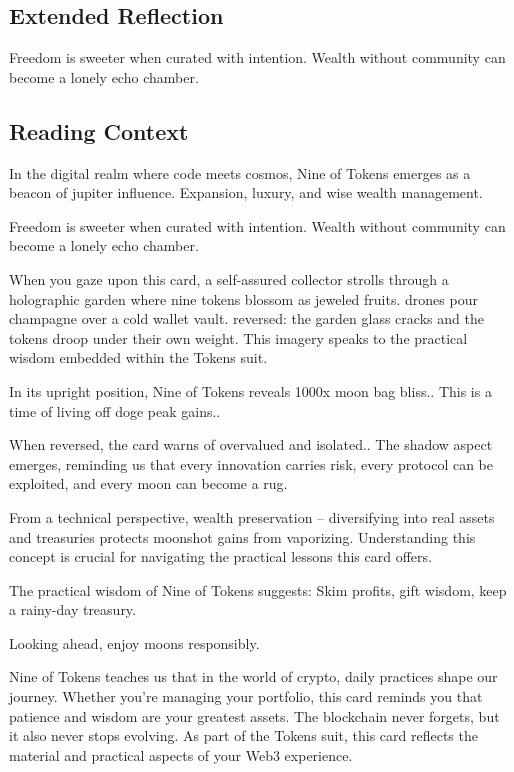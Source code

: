 \documentclass[11pt,oneside]{book}
\begin{document}
\begin{minipage}[t]{0.55\textwidth}
  \subsection*{Extended Reflection}
  Freedom is sweeter when curated with intention. Wealth without community can become a lonely echo chamber.

  \subsection*{Reading Context}
  In the digital realm where code meets cosmos, Nine of Tokens emerges as a beacon of jupiter influence. Expansion, luxury, and wise wealth management.

  Freedom is sweeter when curated with intention. Wealth without community can become a lonely echo chamber.

  When you gaze upon this card, a self-assured collector strolls through a holographic garden where nine tokens blossom as jeweled fruits. drones pour champagne over a cold wallet vault. reversed: the garden glass cracks and the tokens droop under their own weight. This imagery speaks to the practical wisdom embedded within the Tokens suit.

  In its upright position, Nine of Tokens reveals 1000x moon bag bliss.. This is a time of living off doge peak gains..

  When reversed, the card warns of overvalued and isolated.. The shadow aspect emerges, reminding us that every innovation carries risk, every protocol can be exploited, and every moon can become a rug.

  From a technical perspective, wealth preservation – diversifying into real assets and treasuries protects moonshot gains from vaporizing. Understanding this concept is crucial for navigating the practical lessons this card offers.

  The practical wisdom of Nine of Tokens suggests: Skim profits, gift wisdom, keep a rainy-day treasury.

  Looking ahead, enjoy moons responsibly.

  Nine of Tokens teaches us that in the world of crypto, daily practices shape our journey. Whether you're managing your portfolio, this card reminds you that patience and wisdom are your greatest assets. The blockchain never forgets, but it also never stops evolving. As part of the Tokens suit, this card reflects the material and practical aspects of your Web3 experience.

\end{minipage}
\end{document}
